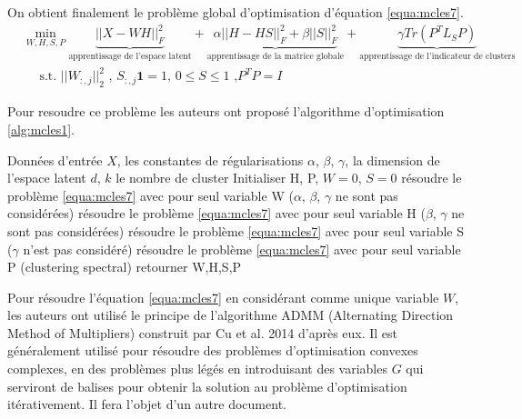 \documentclass[12pt, french, latin.medieval, a4paper]{report}
\begin{document}
	On obtient finalement le problème global d'optimisation d'équation \ref{equa:mcles7}.
	\begin{equation}
    	\begin{split}
        	& \min_{W,H,S,P}  \underbrace{ {|| X - WH ||}_F^2 }_{\text{apprentissage de l'espace latent}}  + \underbrace{ \alpha{|| H - HS ||}_F^2 + \beta {|| S ||}_F^2 }_{\text{apprentissage de la matrice globale}} + \underbrace{ \gamma Tr(P^TL_SP) }_{\text{apprentissage de l'indicateur de clusters}} 
            \\
        	&\quad \text{  s.t. ${|| W_{:,j} ||}_2^2$ , }
        	\text{$S_{:,j}\textbf{1}=1$, $0\leq S \leq1$ ,}
        	\text{$P^TP =I$}
    	\end{split}
    	\label{equa:mcles7}
	\end{equation}

	Pour resoudre ce problème les auteurs ont proposé l'algorithme d'optimisation \ref{alg:mcles1}.
    	\begin{algorithm}[H]
        	\caption{Algorithme d'optimisation MCLES \cite{mcles}}
        	\label{alg:mcles1}
        	\begin{algorithmic}[1]
        	\REQUIRE Données d'entrée $X$, les constantes de régularisations $\alpha$, $\beta$, $\gamma$, la dimension de l'espace latent $d$, $k$ le nombre de cluster
        	\STATE Initialiser H, P, $W = 0$, $S = 0$
        	\REPEAT
            	\STATE résoudre le problème \ref{equa:mcles7} avec pour seul variable W ($\alpha$, $\beta$, $\gamma$ ne sont pas considérées)
            	\STATE résoudre le problème \ref{equa:mcles7} avec pour seul variable H ($\beta$, $\gamma$ ne sont pas considérées)
            	\STATE résoudre le problème \ref{equa:mcles7} avec pour seul variable S ($\gamma$ n'est pas considéré)
            	\STATE résoudre le problème \ref{equa:mcles7} avec pour seul variable P (clustering spectral)
        	\STATE retourner W,H,S,P
        	\end{algorithmic}
    	\end{algorithm}

	Pour résoudre l'équation \ref{equa:mcles7} en considérant comme unique variable $W$, les auteurs ont utilisé le principe de l'algorithme ADMM (Alternating Direction Method of Multipliers) construit par Cu et al. 2014 d'après eux. Il est généralement utilisé pour résoudre des problèmes d'optimisation convexes complexes, en des problèmes plus légés en introduisant des variables $G$ qui serviront de balises pour obtenir la solution au problème d'optimisation itérativement. Il fera l'objet d'un autre document.
\end{document}
